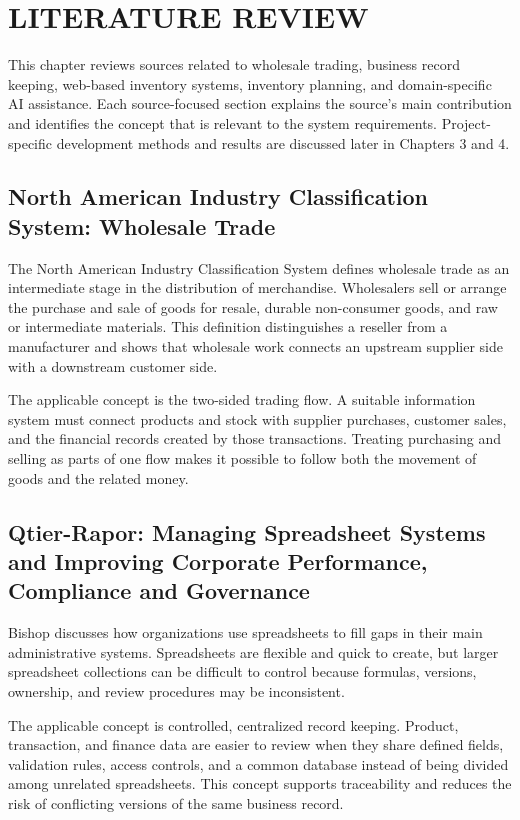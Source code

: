 \chapter{LITERATURE REVIEW}

This chapter reviews sources related to wholesale trading, business record keeping, web-based inventory systems, inventory planning, and domain-specific AI assistance. Each source-focused section explains the source's main contribution and identifies the concept that is relevant to the system requirements. Project-specific development methods and results are discussed later in Chapters 3 and 4.

\section{North American Industry Classification System: Wholesale Trade \cite{naics_2022_wholesale_trade}}
The North American Industry Classification System defines wholesale trade as an intermediate stage in the distribution of merchandise. Wholesalers sell or arrange the purchase and sale of goods for resale, durable non-consumer goods, and raw or intermediate materials. This definition distinguishes a reseller from a manufacturer and shows that wholesale work connects an upstream supplier side with a downstream customer side.

The applicable concept is the two-sided trading flow. A suitable information system must connect products and stock with supplier purchases, customer sales, and the financial records created by those transactions. Treating purchasing and selling as parts of one flow makes it possible to follow both the movement of goods and the related money.

\section{Qtier-Rapor: Managing Spreadsheet Systems and Improving Corporate Performance, Compliance and Governance \cite{bishop2008spreadsheet}}
Bishop discusses how organizations use spreadsheets to fill gaps in their main administrative systems. Spreadsheets are flexible and quick to create, but larger spreadsheet collections can be difficult to control because formulas, versions, ownership, and review procedures may be inconsistent.

The applicable concept is controlled, centralized record keeping. Product, transaction, and finance data are easier to review when they share defined fields, validation rules, access controls, and a common database instead of being divided among unrelated spreadsheets. This concept supports traceability and reduces the risk of conflicting versions of the same business record.


